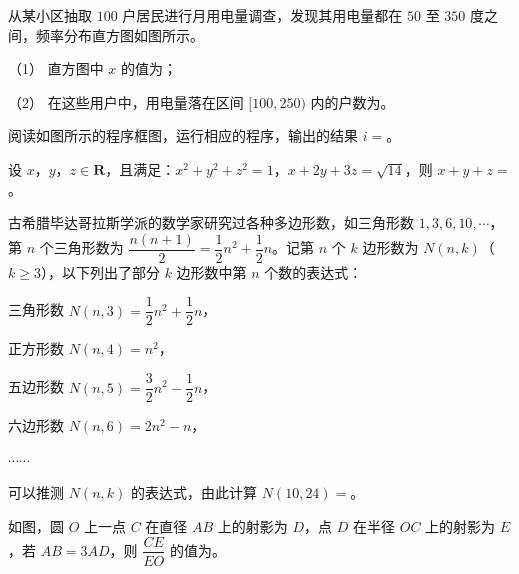\Needspace{0.4\textheight}
\begin{question}
从某小区抽取 $100$ 户居民进行月用电量调查，发现其用电量都在 $50$ 至 $350$ 度之间，频率分布直方图如图所示。

（1） 直方图中 $x$ 的值为\gkblank{}；

（2） 在这些用户中，用电量落在区间 $[100,250)$ 内的户数为\gkblank{}。
\nopagebreak[4]
\begin{center}\end{center}
\nopagebreak[4]
\Needspace{0.4\textheight}
\end{question}
\begin{question}
阅读如图所示的程序框图，运行相应的程序，输出的结果 $i=$\gkblank{}。
\nopagebreak[4]
\begin{center}\end{center}
\nopagebreak[4]
\end{question}
\begin{question}
设 $x$，$y$，$z\in\mathbf R$，且满足：$x^2+y^2+z^2=1$，$x+2y+3z=\sqrt{14}$，则 $x+y+z=$\gkblank{}。

\end{question}
\begin{question}
古希腊毕达哥拉斯学派的数学家研究过各种多边形数，如三角形数 $1,3,6,10,\cdots$，第 $n$ 个三角形数为 $\dfrac{n(n+1)}{2}=\dfrac12n^2+\dfrac12n$。记第 $n$ 个 $k$ 边形数为 $N(n,k)$（$k\geqslant3$），以下列出了部分 $k$ 边形数中第 $n$ 个数的表达式：

三角形数 $N(n,3)=\dfrac12n^2+\dfrac12n$，

正方形数 $N(n,4)=n^2$，

五边形数 $N(n,5)=\dfrac32n^2-\dfrac12n$，

六边形数 $N(n,6)=2n^2-n$，

$\cdots\cdots$

可以推测 $N(n,k)$ 的表达式，由此计算 $N(10,24)=$\gkblank{}。

\Needspace{0.4\textheight}
\end{question}
\begin{question}
如图，圆 $O$ 上一点 $C$ 在直径 $AB$ 上的射影为 $D$，点 $D$ 在半径 $OC$ 上的射影为 $E$，若 $AB=3AD$，则 $\dfrac{CE}{EO}$ 的值为\gkblank{}。
\nopagebreak[4]
\begin{center}\end{center}
\nopagebreak[4]
\end{question}
